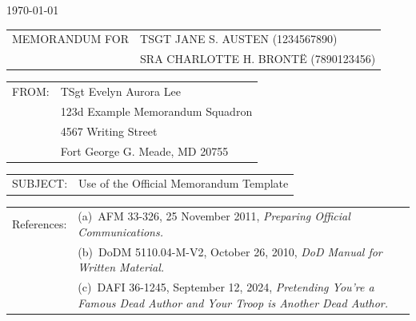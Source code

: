 \documentclass[12pt]{article}
\newlength{\extraSpaceLength}
\newcommand{\setcolumnwidth}[2]{
    \newlength{#1}%
    \settowidth{#1}{#2}%
    \addtolength{#1}{\extraSpaceLength} %
}
\begin{document}
\pagestyle{default}
\thispagestyle{firstpage}
\RaggedRight


\noindent\hfill\DTG\today

\setcolumnwidth{\memoWidth}{MEMORANDUM FOR}
\noindent
\begin{tabularx}{\textwidth}{@{} p{\memoWidth} @{} X @{}} 
MEMORANDUM FOR & TSGT JANE S. AUSTEN (1234567890)\\
               & SRA CHARLOTTE H. BRONTË (7890123456)\\
\end{tabularx}

\setcolumnwidth{\fromWidth}{FROM:}
\noindent
\begin{tabularx}{\textwidth}{@{} p{\fromWidth} @{} X @{}} 
FROM: & TSgt Evelyn Aurora Lee\\
      & 123d Example Memorandum Squadron\\
      & 4567 Writing Street\\
      & Fort George G. Meade, MD 20755\\
\end{tabularx}

\setcolumnwidth{\subjectWidth}{SUBJECT:}
\noindent
\begin{tabularx}{\textwidth}{@{} p{\subjectWidth} @{} X @{}} 
SUBJECT: & Use of the Official Memorandum Template\\
\end{tabularx}

\setcolumnwidth{\referencesWidth}{References:}
\noindent
\begin{tabularx}{\textwidth}{@{} p{} @{} X @{}} 
References: & (a)~AFM 33-326, 25 November 2011, \textit{Preparing Official Communications.}\\
            & (b)~DoDM 5110.04-M-V2, October 26, 2010, \textit{DoD Manual for Written Material.}\\
            & (c)~DAFI 36-1245, September 12, 2024, \textit{Pretending You're a Famous Dead Author and Your Troop is Another Dead Author.}\\
\end{tabularx}
\end{document}
